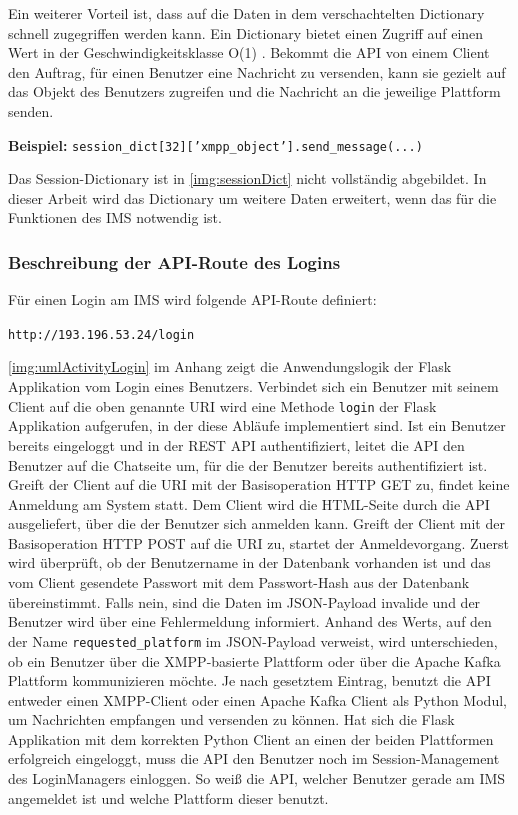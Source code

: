 \documentclass[a4paper,titlepage,halfparskip,12pt]{scrreprt}
\begin{document}
\begin{onehalfspacing}
Ein weiterer Vorteil ist, dass auf die Daten in dem verschachtelten Dictionary schnell zugegriffen werden kann. Ein Dictionary bietet einen Zugriff auf einen Wert in der Geschwindigkeitsklasse O(1) \cite{pythonSpeed}. Bekommt die \acs{API} von einem Client den Auftrag, für einen Benutzer eine Nachricht zu versenden, kann sie gezielt auf das Objekt des Benutzers zugreifen und die Nachricht an die jeweilige Plattform senden.

\textbf{Beispiel:} \texttt{session\_dict[32]['xmpp\_object'].send\_message(...)}

Das Session-Dictionary ist in \autoref{img:sessionDict} nicht vollständig abgebildet. In dieser Arbeit wird das Dictionary um weitere Daten erweitert, wenn das für die Funktionen des \acs{IMS} notwendig ist.

\subsubsection*{Beschreibung der \acs{API}-Route des Logins}

Für einen Login am \ac{IMS} wird folgende \acs{API}-Route definiert:

\texttt{http://193.196.53.24/login}

\autoref{img:umlActivityLogin} im Anhang zeigt die Anwendungslogik der Flask Applikation vom Login eines Benutzers. Verbindet sich ein Benutzer mit seinem Client auf die oben genannte \acs{URI} wird eine Methode \texttt{login} der Flask Applikation aufgerufen, in der diese Abläufe implementiert sind. Ist ein Benutzer bereits eingeloggt und in der \acs{REST} \acs{API} authentifiziert, leitet die \acs{API} den Benutzer auf die Chatseite um, für die der Benutzer bereits authentifiziert ist. Greift der Client auf die \acs{URI} mit der Basisoperation \acs{HTTP} GET zu, findet keine Anmeldung am System statt. Dem Client wird die \acs{HTML}-Seite durch die \acs{API} ausgeliefert, über die der Benutzer sich anmelden kann. Greift der Client mit der Basisoperation \acs{HTTP} POST auf die \acs{URI} zu, startet der Anmeldevorgang. Zuerst wird überprüft, ob der Benutzername in der Datenbank vorhanden ist und das vom Client gesendete Passwort mit dem Passwort-Hash aus der Datenbank übereinstimmt. Falls nein, sind die Daten im \acs{JSON}-Payload invalide und der Benutzer wird über eine Fehlermeldung informiert. Anhand des Werts, auf den der Name \texttt{requested\_platform} im \acs{JSON}-Payload verweist, wird unterschieden, ob ein Benutzer über die \acs{XMPP}-basierte Plattform oder über die Apache Kafka Plattform kommunizieren möchte. Je nach gesetztem Eintrag, benutzt die \acs{API} entweder einen \acs{XMPP}-Client oder einen Apache Kafka Client als Python Modul, um Nachrichten empfangen und versenden zu können. Hat sich die Flask Applikation mit dem korrekten Python Client an einen der beiden Plattformen erfolgreich eingeloggt, muss die \ac{API} den Benutzer noch im Session-Management des LoginManagers einloggen. So weiß die \acs{API}, welcher Benutzer gerade am \acs{IMS} angemeldet ist und welche Plattform dieser benutzt.


\end{onehalfspacing}
\end{document}
